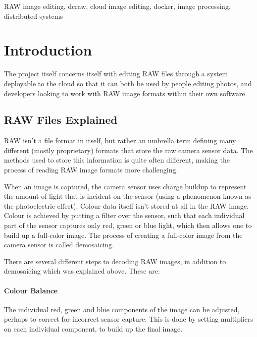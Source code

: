 \documentclass[10pt,a4paper]{article}
\begin{document}
\begin{abstract}
\end{abstract}

\begin{keywords}
RAW image editing, dcraw, cloud image editing, docker, image processing, distributed systems
\end{keywords}

\section{Introduction}

The project itself concerns itself with editing RAW files through a system deployable to the cloud
so that it can both be used by people editing photos, and developers looking to work with RAW image formats
within their own software.

\subsection{RAW Files Explained}
RAW isn't a file format in itself, but rather an umbrella term defining many different (mostly proprietary) formats that store the
raw camera sensor data. The methods used to store this information is quite often different, making the process of reading
RAW image formats more challenging.

When an image is captured, the camera sensor uses charge buildup to represent the amount of light that is incident on the sensor
(using a phenomenon known as the photoelectric effect). Colour data itself isn't stored at all in the RAW image. Colour is achieved
by putting a filter over the sensor, such that each individual part of the sensor captures only red, green or blue light, which then
allows one to build up a full-color image. The process of creating a full-color image from the camera sensor is called demosaicing. 
\cite{UnderstandingRAWCapture}

There are several different steps to decoding RAW images, in addition to demosaicing which was explained above. These are:

\paragraph{Colour Balance}
The individual red, green and blue components of the image can be adjusted, perhaps to correct for incorrect sensor capture.
This is done by setting multipliers on each individual component, to build up the final image.
\end{document}

